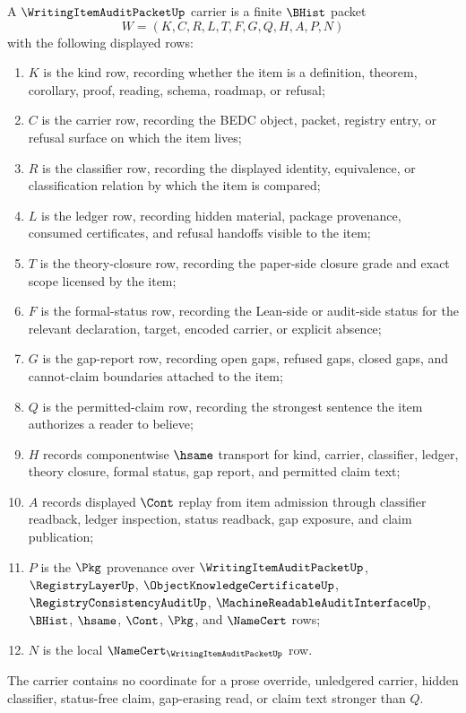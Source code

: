 \begin{definition}
\label{def:writing-item-audit-packet-carrier}
A $\WritingItemAuditPacketUp$ carrier is a finite $\BHist$ packet
$$
W=(K,C,R,L,T,F,G,Q,H,A,P,N)
$$
with the following displayed rows:
\begin{enumerate}
\item $K$ is the kind row, recording whether the item is a definition, theorem, corollary, proof, reading, schema, roadmap, or refusal;
\item $C$ is the carrier row, recording the BEDC object, packet, registry entry, or refusal surface on which the item lives;
\item $R$ is the classifier row, recording the displayed identity, equivalence, or classification relation by which the item is compared;
\item $L$ is the ledger row, recording hidden material, package provenance, consumed certificates, and refusal handoffs visible to the item;
\item $T$ is the theory-closure row, recording the paper-side closure grade and exact scope licensed by the item;
\item $F$ is the formal-status row, recording the Lean-side or audit-side status for the relevant declaration, target, encoded carrier, or explicit absence;
\item $G$ is the gap-report row, recording open gaps, refused gaps, closed gaps, and cannot-claim boundaries attached to the item;
\item $Q$ is the permitted-claim row, recording the strongest sentence the item authorizes a reader to believe;
\item $H$ records componentwise $\hsame$ transport for kind, carrier, classifier, ledger, theory closure, formal status, gap report, and permitted claim text;
\item $A$ records displayed $\Cont$ replay from item admission through classifier readback, ledger inspection, status readback, gap exposure, and claim publication;
\item $P$ is the $\Pkg$ provenance over $\WritingItemAuditPacketUp$, $\RegistryLayerUp$, $\ObjectKnowledgeCertificateUp$, $\RegistryConsistencyAuditUp$, $\MachineReadableAuditInterfaceUp$, $\BHist$, $\hsame$, $\Cont$, $\Pkg$, and $\NameCert$ rows;
\item $N$ is the local $\NameCert_{\WritingItemAuditPacketUp}$ row.
\end{enumerate}
The carrier contains no coordinate for a prose override, unledgered carrier, hidden classifier, status-free claim, gap-erasing read, or claim text stronger than $Q$.
\end{definition}

